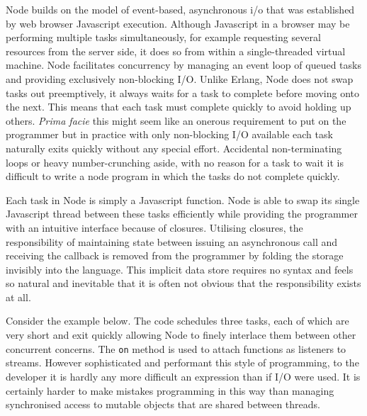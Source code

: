 \documentclass[12pt, ]{article}
\begin{document}
Node builds on the model of event-based, asynchronous i/o that was
established by web browser Javascript execution. Although Javascript in
a browser may be performing multiple tasks simultaneously, for example
requesting several resources from the server side, it does so from
within a single-threaded virtual machine. Node facilitates concurrency
by managing an event loop of queued tasks and providing exclusively
non-blocking I/O. Unlike Erlang, Node does not swap tasks out
preemptively, it always waits for a task to complete before moving onto
the next. This means that each task must complete quickly to avoid
holding up others. \emph{Prima facie} this might seem like an onerous
requirement to put on the programmer but in practice with only
non-blocking I/O available each task naturally exits quickly without any
special effort. Accidental non-terminating loops or heavy
number-crunching aside, with no reason for a task to wait it is
difficult to write a node program in which the tasks do not complete
quickly.

Each task in Node is simply a Javascript function. Node is able to swap
its single Javascript thread between these tasks efficiently while
providing the programmer with an intuitive interface because of
closures. Utilising closures, the responsibility of maintaining state
between issuing an asynchronous call and receiving the callback is
removed from the programmer by folding the storage invisibly into the
language. This implicit data store requires no syntax and feels so
natural and inevitable that it is often not obvious that the
responsibility exists at all.

Consider the example below. The code schedules three tasks, each of
which are very short and exit quickly allowing Node to finely interlace
them between other concurrent concerns. The \texttt{on} method is used
to attach functions as listeners to streams. However sophisticated and
performant this style of programming, to the developer it is hardly any
more difficult an expression than if I/O were used. It is certainly
harder to make mistakes programming in this way than managing
synchronised access to mutable objects that are shared between threads.
\end{document}
